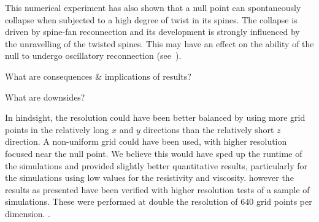 This numerical experiment has also shown that a null point can spontaneously collapse when subjected to a high degree of twist in its spines. The collapse is driven by spine-fan reconnection and its development is strongly influenced by the unravelling of the twisted spines. This may have an effect on the ability of the null to undergo oscillatory reconnection (see~\cite{thurgoodThreedimensionalOscillatoryMagnetic2017}).

What are consequences \& implications of results?

What are downsides?

In hindsight, the resolution could have been better balanced by using more grid points in the relatively long $x$ and $y$ directions than the relatively short $z$ direction. A non-uniform grid could have been used, with higher resolution focused near the null point. We believe this would have sped up the runtime of the simulations and provided slightly better quantitative results, particularly for the simulations using low values for the resistivity and viscosity. however the results as presented have been verified with higher resolution tests of a sample of simulations. These were performed at double the resolution of $640$ grid points per dimension. .
